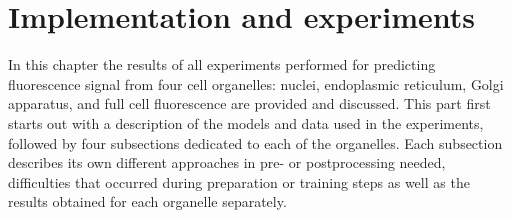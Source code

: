 \section{Implementation and experiments}
In this chapter the results of all experiments performed for predicting fluorescence signal from four cell organelles: nuclei, endoplasmic reticulum, Golgi apparatus, and full cell fluorescence are provided and discussed. This part first starts out with a description of the models and data used in the experiments, followed by four subsections dedicated to each of the organelles. Each subsection describes its own different approaches in pre- or postprocessing needed, difficulties that occurred during preparation or training steps as well as the results obtained for each organelle separately.

    
    \pagebreak
    
    \pagebreak
    
    \pagebreak
    
    \pagebreak
    